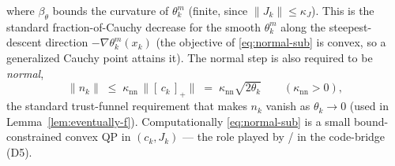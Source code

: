 where $\beta_\theta$ bounds the curvature of $\theta_k^m$ (finite, since
$\|J_k\|\le\kappa_J$). This is the standard fraction-of-Cauchy decrease for the
smooth $\theta_k^m$ along the steepest-descent direction $-\nabla\theta_k^m(x_k)$
(the objective of \eqref{eq:normal-sub} is convex, so a generalized Cauchy point
attains it). The normal step is also required to be \emph{normal},
\begin{equation}
  \label{eq:normal-size}
  \|n_k\| \;\le\; \kappa_{\mathrm{nn}}\,\bigl\|[\,c_k\,]_+\bigr\|
             \;=\; \kappa_{\mathrm{nn}}\sqrt{2\theta_k}
  \qquad(\kappa_{\mathrm{nn}}>0),
\end{equation}
the standard trust-funnel requirement \citep[\S2]{GouldToint2010} that makes $n_k$
vanish as $\theta_k\to0$ (used in Lemma~\ref{lem:eventually-f}). Computationally
\eqref{eq:normal-sub} is a small bound-constrained convex QP in $(c_k,J_k)$ --- the
role played by / in the code-bridge (D5).

